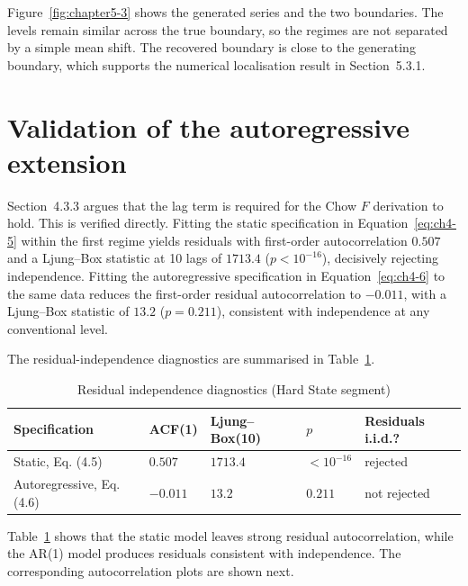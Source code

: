 Figure~\ref{fig:chapter5-3} shows the generated series and the two boundaries. The
levels remain similar across the true boundary, so the regimes are not separated by
a simple mean shift. The recovered boundary is close to the generating boundary,
which supports the numerical localisation result in Section~5.3.1.


\section{Validation of the autoregressive extension}

Section~4.3.3 argues that the lag term is required for the Chow $F$ derivation to hold. This
is verified directly. Fitting the static specification in Equation~\eqref{eq:ch4-5} within the first regime
yields residuals with first-order autocorrelation $0.507$ and a Ljung--Box statistic at
10 lags of $1713.4$ ($p < 10^{-16}$), decisively rejecting independence. Fitting the
autoregressive specification in Equation~\eqref{eq:ch4-6} to the same data reduces the first-order residual
autocorrelation to $-0.011$, with a Ljung--Box statistic of $13.2$ ($p = 0.211$),
consistent with independence at any conventional level.

The residual-independence diagnostics are summarised in Table~\ref{tab:ch5-residuals}.



\begin{table}[htbp]
    \centering
    \small
    \caption{Residual independence diagnostics (Hard State segment)}
    \label{tab:ch5-residuals}
    \begin{tabularx}{\textwidth}{|>{\raggedright\arraybackslash}X|>{\raggedright\arraybackslash}X|>{\raggedright\arraybackslash}X|>{\raggedright\arraybackslash}X|>{\raggedright\arraybackslash}X|}
        \hline
        Specification & ACF(1) & Ljung--Box(10) & $p$ & Residuals i.i.d.? \\ \hline
        Static, Eq. (4.5) & $0.507$ & $1713.4$ & $<10^{-16}$ & rejected \\ \hline
        Autoregressive, Eq. (4.6) & $-0.011$ & $13.2$ & $0.211$ & not rejected \\ \hline
    \end{tabularx}
\end{table}

Table~\ref{tab:ch5-residuals} shows that the static model leaves strong residual
autocorrelation, while the AR(1) model produces residuals consistent with independence.
The corresponding autocorrelation plots are shown next.

